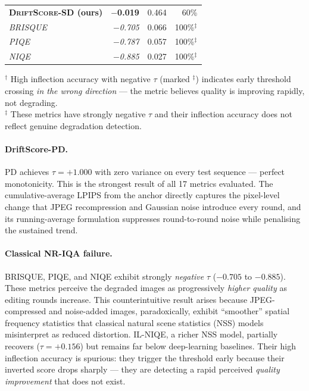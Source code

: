 \documentclass[sigconf]{acmart}
\newcommand{\DS}{\textsc{DriftScore}}
\newcommand{\PD}{\ensuremath{\mathrm{PD}}}
\begin{document}
\begin{table}[t]
\begin{tabular}{lrrr}
    \textbf{\DS{}-SD (ours)}   & \textbf{$-$0.019} & 0.464 & 60\% \\
    \textit{BRISQUE}           & \textit{$-$0.705} & 0.066 & 100\%$^\ddagger$ \\
    \textit{PIQE}              & \textit{$-$0.787} & 0.057 & 100\%$^\ddagger$ \\
    \textit{NIQE}              & \textit{$-$0.885} & 0.027 & 100\%$^\ddagger$ \\
    \bottomrule
  \end{tabular}
  \vspace{0.5em}
  \footnotesize
  $^\dagger$ High inflection accuracy with negative $\tau$ (marked $^\ddagger$)
  indicates early threshold crossing \emph{in the wrong direction} ---
  the metric believes quality is improving rapidly, not degrading. \\
  $^\ddagger$ These metrics have strongly negative $\tau$ and their inflection
  accuracy does not reflect genuine degradation detection.
\end{table}

\paragraph{DriftScore-PD.}
$\PD$ achieves $\tau = +1.000$ with zero variance on every test sequence
--- perfect monotonicity.
This is the strongest result of all 17 metrics evaluated.
The cumulative-average LPIPS from the anchor directly captures the
pixel-level change that JPEG recompression and Gaussian noise introduce
every round, and its running-average formulation suppresses round-to-round
noise while penalising the sustained trend.

\paragraph{Classical NR-IQA failure.}
BRISQUE, PIQE, and NIQE exhibit strongly \emph{negative} $\tau$
($-0.705$ to $-0.885$).
These metrics perceive the degraded images as progressively
\emph{higher quality} as editing rounds increase.
This counterintuitive result arises because JPEG-compressed and
noise-added images, paradoxically, exhibit ``smoother'' spatial frequency
statistics that classical natural scene statistics (NSS) models
misinterpret as reduced distortion.
IL-NIQE, a richer NSS model, partially recovers ($\tau = +0.156$) but
remains far below deep-learning baselines.
Their high inflection accuracy is spurious: they trigger the threshold
early because their inverted score drops sharply --- they are detecting
a rapid perceived \emph{quality improvement} that does not exist.
\end{document}

